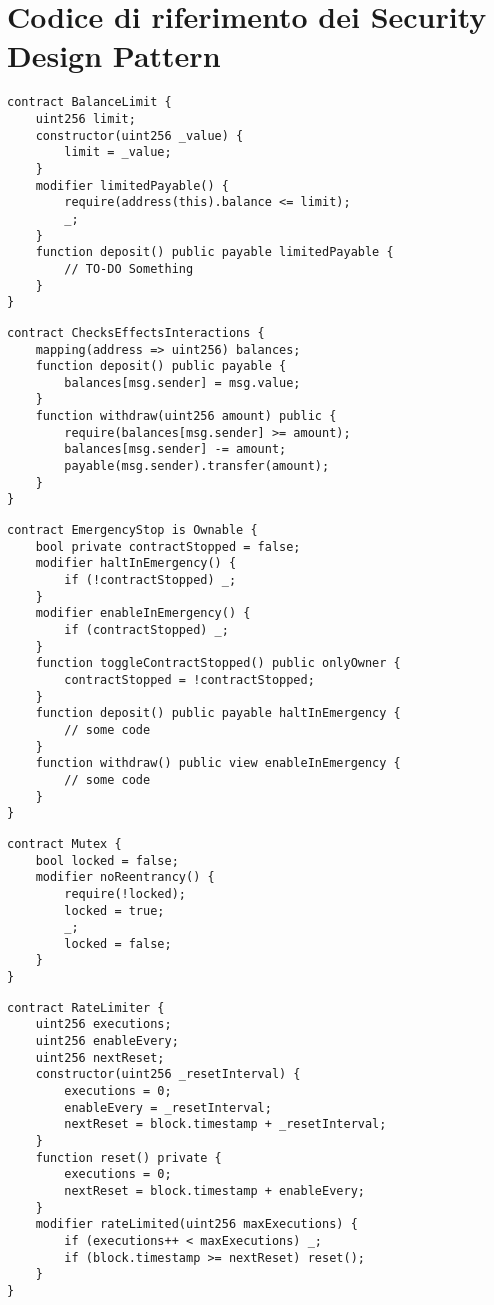 {\section{Codice di riferimento dei Security Design Pattern}

{\begin{lstlisting}[language=Solidity, caption={Codice di riferimento per Balance Limit}, label={appendix:balance_limit}]
contract BalanceLimit {
	uint256 limit;
	constructor(uint256 _value) {
		limit = _value;
	}
	modifier limitedPayable() {
		require(address(this).balance <= limit);
		_;
	}
	function deposit() public payable limitedPayable {
		// TO-DO Something
	}
}
\end{lstlisting}}

{\begin{lstlisting}[language=Solidity, caption={Codice di riferimento per Check Effects Interactions}, label={appendix:check_effects_interactions}]
contract ChecksEffectsInteractions {
	mapping(address => uint256) balances;
	function deposit() public payable {
		balances[msg.sender] = msg.value;
	}
	function withdraw(uint256 amount) public {
		require(balances[msg.sender] >= amount);
		balances[msg.sender] -= amount;
		payable(msg.sender).transfer(amount);
	}
}
\end{lstlisting}}

{\begin{lstlisting}[language=Solidity, caption={Codice di riferimento per Emergency Stop}, label={appendix:emergency_stop}]
contract EmergencyStop is Ownable {
	bool private contractStopped = false;
	modifier haltInEmergency() {
		if (!contractStopped) _;
	}
	modifier enableInEmergency() {
		if (contractStopped) _;
	}
	function toggleContractStopped() public onlyOwner {
		contractStopped = !contractStopped;
	}
	function deposit() public payable haltInEmergency {
		// some code
	}
	function withdraw() public view enableInEmergency {
		// some code
	}
}
\end{lstlisting}}
\newpage
{\begin{lstlisting}[language=Solidity, caption={Codice di riferimento per Mutex}, label={appendix:mutex}]
contract Mutex {
	bool locked = false;
	modifier noReentrancy() {
		require(!locked);
		locked = true;
		_;
		locked = false;
	}
}
\end{lstlisting}}

{\begin{lstlisting}[language=Solidity, caption={Codice di riferimento per Rate Limit}, label={appendix:rate_limit}]
contract RateLimiter {
	uint256 executions;
	uint256 enableEvery;
	uint256 nextReset;
	constructor(uint256 _resetInterval) {
		executions = 0;
		enableEvery = _resetInterval;
		nextReset = block.timestamp + _resetInterval;
	}
	function reset() private {
		executions = 0;
		nextReset = block.timestamp + enableEvery;
	}
	modifier rateLimited(uint256 maxExecutions) {
		if (executions++ < maxExecutions) _;
		if (block.timestamp >= nextReset) reset();
	}
}
\end{lstlisting}}

}
